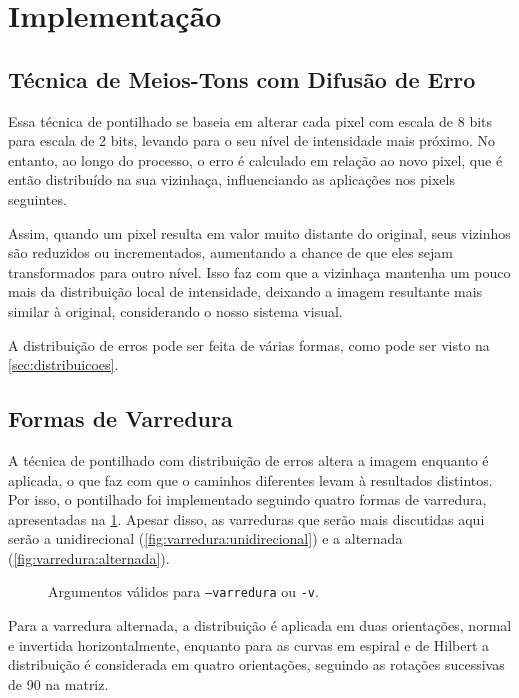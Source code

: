 \section{Implementação} \label{sec:impl}

\subsection{Técnica de Meios-Tons com Difusão de Erro}

    Essa técnica de pontilhado se baseia em alterar cada pixel com escala de 8 bits para escala de 2 bits, levando para o seu nível de intensidade mais próximo. No entanto, ao longo do processo, o erro é calculado em relação ao novo pixel, que é então distribuído na sua vizinhaça, influenciando as aplicações nos pixels seguintes.

    Assim, quando um pixel resulta em valor muito distante do original, seus vizinhos são reduzidos ou incrementados, aumentando a chance de que eles sejam transformados para outro nível. Isso faz com que a vizinhaça mantenha um pouco mais da distribuição local de intensidade, deixando a imagem resultante mais similar à original, considerando o nosso sistema visual.

    A distribuição de erros pode ser feita de várias formas, como pode ser visto na \cref{sec:distribuicoes}.

\subsection{Formas de Varredura} \label{sec:varredura}

    A técnica de pontilhado com distribuição de erros altera a imagem enquanto é aplicada, o que faz com que o caminhos diferentes levam à resultados distintos. Por isso, o pontilhado foi implementado seguindo quatro formas de varredura, apresentadas na \cref{fig:varredura}. Apesar disso, as varreduras que serão mais discutidas aqui serão a unidirecional (\ref{fig:varredura:unidirecional}) e a alternada (\ref{fig:varredura:alternada}).

    \begin{figure}[H]
        \centering
        

        \caption{Argumentos válidos para \texttt{--varredura} ou \texttt{-v}.}
        \label{fig:varredura}
    \end{figure}

    Para a varredura alternada, a distribuição é aplicada em duas orientações, normal e invertida horizontalmente, enquanto para as curvas em espiral e de Hilbert a distribuição é considerada em quatro orientações, seguindo as rotações sucessivas de 90\textdegree{} na matriz.

